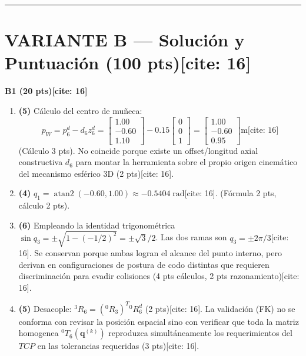 \documentclass[11pt, a4paper]{article}
\begin{document}
\vspace{0.3cm}
\hrule
\vspace{0.3cm}

\section*{VARIANTE B — Solución y Puntuación (100 pts)[cite: 16]}

\textbf{B1 (20 pts)[cite: 16]}
\begin{enumerate}\footnotesize
    \item \textbf{(5)} Cálculo del centro de muñeca:
    \begin{equation*}
        p_W = p_6^d - d_6 z_6^d = \begin{bmatrix} 1.00 \\ -0.60 \\ 1.10 \end{bmatrix} - 0.15 \begin{bmatrix} 0 \\ 0 \\ 1 \end{bmatrix} = \begin{bmatrix} 1.00 \\ -0.60 \\ 0.95 \end{bmatrix}\mathrm{m} \text{[cite: 16]}
    \end{equation*}
    (Cálculo 3 pts). No coincide porque existe un offset/longitud axial constructiva $d_6$ para montar la herramienta sobre el propio origen cinemático del mecanismo esférico 3D (2 pts)[cite: 16].
    \item \textbf{(4)} $q_1 = \operatorname{atan2}(-0.60, 1.00) \approx -0.5404\;\mathrm{rad}$[cite: 16]. (Fórmula 2 pts, cálculo 2 pts).
    \item \textbf{(6)} Empleando la identidad trigonométrica $\sin q_3 = \pm\sqrt{1 - (-1/2)^2} = \pm\sqrt{3}/2$. Las dos ramas son $q_3 = \pm 2\pi/3$[cite: 16]. Se conservan porque ambas logran el alcance del punto interno, pero derivan en configuraciones de postura de codo distintas que requieren discriminación para evadir colisiones (4 pts cálculos, 2 pts razonamiento)[cite: 16].
    \item \textbf{(5)} Desacople: ${}^3R_6 = ({}^0R_3)^T {}^0R_6^d$ (2 pts)[cite: 16]. La validación (FK) no se conforma con revisar la posición espacial sino con verificar que toda la matriz homogenea ${}^0T_6(\mathbf{q}^{(k)})$ reproduzca simultáneamente los requerimientos del $TCP$ en las tolerancias requeridas (3 pts)[cite: 16].
\end{enumerate}
\end{document}

